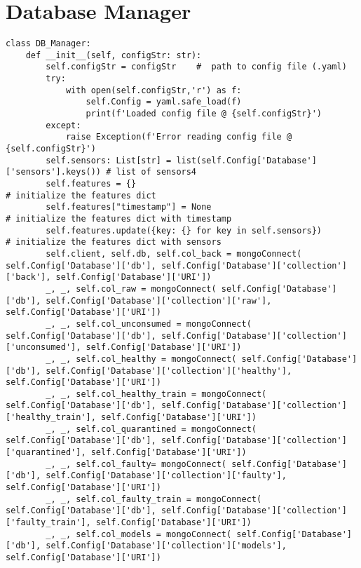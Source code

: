 \section{Database Manager}
\label{sec:dbmanager}
\begin{verbatim}
class DB_Manager:
    def __init__(self, configStr: str):
        self.configStr = configStr    #  path to config file (.yaml)
        try:
            with open(self.configStr,'r') as f:
                self.Config = yaml.safe_load(f)
                print(f'Loaded config file @ {self.configStr}')
        except:
            raise Exception(f'Error reading config file @ {self.configStr}')
        self.sensors: List[str] = list(self.Config['Database']['sensors'].keys()) # list of sensors4
        self.features = {}                                                              # initialize the features dict
        self.features["timestamp"] = None                                               # initialize the features dict with timestamp
        self.features.update({key: {} for key in self.sensors})                         # initialize the features dict with sensors                              
        self.client, self.db, self.col_back = mongoConnect( self.Config['Database']['db'], self.Config['Database']['collection']['back'], self.Config['Database']['URI'])
        _, _, self.col_raw = mongoConnect( self.Config['Database']['db'], self.Config['Database']['collection']['raw'], self.Config['Database']['URI'])
        _, _, self.col_unconsumed = mongoConnect( self.Config['Database']['db'], self.Config['Database']['collection']['unconsumed'], self.Config['Database']['URI'])
        _, _, self.col_healthy = mongoConnect( self.Config['Database']['db'], self.Config['Database']['collection']['healthy'], self.Config['Database']['URI'])
        _, _, self.col_healthy_train = mongoConnect( self.Config['Database']['db'], self.Config['Database']['collection']['healthy_train'], self.Config['Database']['URI'])
        _, _, self.col_quarantined = mongoConnect( self.Config['Database']['db'], self.Config['Database']['collection']['quarantined'], self.Config['Database']['URI'])
        _, _, self.col_faulty= mongoConnect( self.Config['Database']['db'], self.Config['Database']['collection']['faulty'], self.Config['Database']['URI'])
        _, _, self.col_faulty_train = mongoConnect( self.Config['Database']['db'], self.Config['Database']['collection']['faulty_train'], self.Config['Database']['URI'])
        _, _, self.col_models = mongoConnect( self.Config['Database']['db'], self.Config['Database']['collection']['models'], self.Config['Database']['URI'])
    

\end{verbatim}
